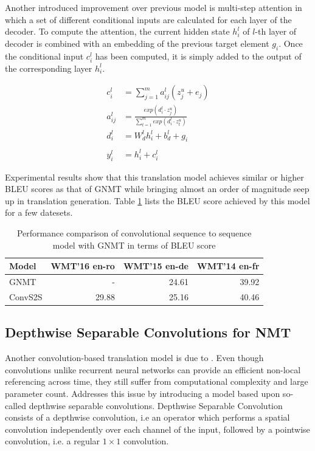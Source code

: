 \documentclass[a4paper]{article}
\begin{document}
Another  introduced  improvement over  previous model is multi-step attention in
which a set of different conditional inputs are calculated for each layer of the
decoder. To compute the attention,  the current  hidden  state $h^l_i$ of $l$-th
layer of decoder  is combined with an  embedding of the previous target  element
$g_i$. Once  the conditional input $c_i^l$ has been computed, it is simply added
to the output of the corresponding layer $h^l_i$.


\begin{align*}
  c_i^l &= \sum_{j = 1}^{m}{a_{ij}^l(z_j^u + e_j)} \\
  a_{ij}^l &= \frac{exp(d_i^l \cdot z_j^u)}
  {\sum_{t = 1}^{m}{exp(d_i^l \cdot z_t^u)}} \\
  d_i^l &= W_d^l h_i^l + b_d^l + g_i \\
  \\
  y_i^l &= h_i^l + c_i^l
\end{align*}


Experimental results show that this translation model achieves similar or higher
BLEU scores  as that of GNMT while bringing almost an order of magnitude seep up
in translation generation. Table \ref{tab:convseq2seqbleu} lists the  BLEU score
achieved by this model for a few datesets.


\begin{table}
  \center
  \begin{tabular}{lrrr}
  \hline
    Model & WMT'16 en-ro & WMT'15 en-de & WMT'14 en-fr \\
  \hline
    GNMT & - & 24.61 & 39.92 \\
    ConvS2S & 29.88 & 25.16 & 40.46 \\
  \hline
  \end{tabular}
  \caption{Performance  comparison of convolutional  sequence to  sequence model
  with GNMT in terms of BLEU score}
  \label{tab:convseq2seqbleu}
\end{table}


\subsection{Depthwise Separable Convolutions for NMT}

Another     convolution-based      translation      model     is     due      to
\citet{DBLP:journals/corr/KaiserGC17}. Even though convolutions unlike recurrent
neural networks can provide an efficient non-local referencing across time, they
still  suffer   from  computational   complexity  and   large  parameter  count.
\cite{DBLP:journals/corr/KaiserGC17} Addresses this issue by introducing a model
based upon  so-called  depthwise  separable  convolutions.  Depthwise  Separable
Convolution  consists of a depthwise convolution, i.e an operator which performs
a spatial convolution independently over each  channel of the input, followed by
a pointwise convolution, i.e. a regular $1 \times 1$ convolution.
\end{document}
